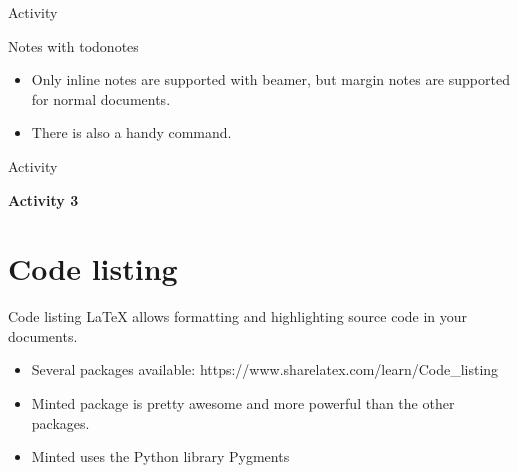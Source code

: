 \documentclass{beamer}
\let\todox\todo
\renewcommand\todo[1]{\todox[inline]{#1}}
\begin{document}
\begin{darkframes}
\begin{frame}[fragile]{Activity}
\end{frame}



\begin{frame}[fragile]{Notes with todonotes}
\begin{itemize}
	\item Only inline notes are supported with
	beamer, but margin notes are supported for normal
	documents.
	\item There is also a handy \texttt{\listoftodos} command.
\end{itemize}
	
\end{frame}

\begin{frame}[fragile]{Activity}
	\begin{center}
		{\Large \textbf{Activity 3}}
	\end{center}
	
\end{frame}

\section{Code listing}

\begin{frame}[fragile]{Code listing}
LaTeX allows formatting and highlighting source code in your documents.
\begin{itemize}
	\item Several packages available: https://www.sharelatex.com/learn/Code\_listing
	\item Minted package  is pretty awesome and more powerful than the other  packages.
	\item  Minted uses the Python library Pygments
\end{itemize}
\end{frame}



\end{darkframes}
\end{document}
